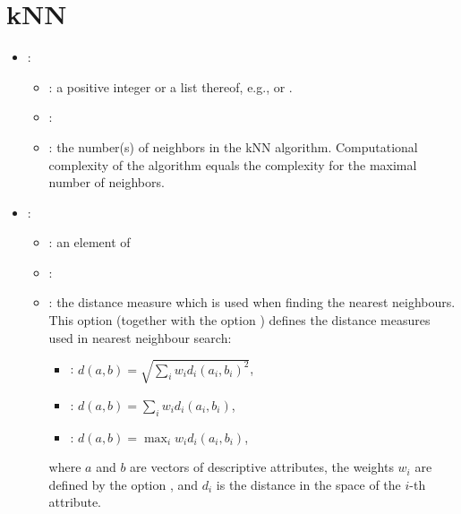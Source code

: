 \section{kNN}


\begin{itemize}
    \item {}:
    \begin{itemize}
        \item \optionPossibleValues{}: a positive integer or a list thereof, e.g.,  or \formatOneElement{[1,5,10]}.
        \item \optionDefaultValue{}: \optionDefaultValueStyle{[1,3]}
        \item \optionDescrption{}: the number(s) of neighbors in the kNN algorithm. Computational complexity of the algorithm equals
        the complexity for the maximal number of neighbors.
    \end{itemize}
    \item {}:
    \begin{itemize}
        \item \optionPossibleValues{}: an element of
        \item \optionDefaultValue{}: 
        \item \optionDescrption{}: the distance measure which is used when finding the nearest neighbours.        
        This option (together with the option ) defines the distance measures used in nearest neighbour search:
        \begin{itemize}
            \item {}: $d(a, b) = \sqrt{\sum_i w_i d_i(a_i, b_i)^2}$,
            \item {}: $d(a, b) = \sum_i w_i d_i(a_i, b_i)$,
            \item {}: $d(a, b) = \max_i w_i d_i(a_i, b_i)$,
        \end{itemize}
        where $a$ and $b$ are vectors of descriptive attributes, the weights $w_i$ are defined by the option ,
        and $d_i$ is the distance in the space of the $i$-th attribute.
        

\end{itemize}
\end{itemize}

